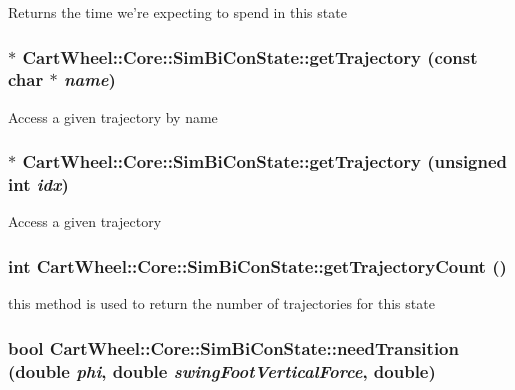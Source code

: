 \label{classCartWheel_1_1Core_1_1SimBiConState_a1af7171d7a15d9dbf166f69b927eee6d}
Returns the time we're expecting to spend in this state \hypertarget{classCartWheel_1_1Core_1_1SimBiConState_ab3928777c060a556240b59b3d78d909f}{
\subsubsection[{getTrajectory}]{$\ast$ CartWheel::Core::SimBiConState::getTrajectory (const char $\ast$ {\em name})}}
\label{classCartWheel_1_1Core_1_1SimBiConState_ab3928777c060a556240b59b3d78d909f}
Access a given trajectory by name \hypertarget{classCartWheel_1_1Core_1_1SimBiConState_a769bdbaf978d76ade4eb32328f1dcaae}{
\subsubsection[{getTrajectory}]{$\ast$ CartWheel::Core::SimBiConState::getTrajectory (unsigned int {\em idx})}}
\label{classCartWheel_1_1Core_1_1SimBiConState_a769bdbaf978d76ade4eb32328f1dcaae}
Access a given trajectory \hypertarget{classCartWheel_1_1Core_1_1SimBiConState_a74bb53554ca7b7ac9a37dd1ce8d2b488}{
\subsubsection[{getTrajectoryCount}]{\setlength{\rightskip}{0pt plus 5cm}int CartWheel::Core::SimBiConState::getTrajectoryCount ()}}
\label{classCartWheel_1_1Core_1_1SimBiConState_a74bb53554ca7b7ac9a37dd1ce8d2b488}
this method is used to return the number of trajectories for this state \hypertarget{classCartWheel_1_1Core_1_1SimBiConState_ab81a60307b3864c9db6953a09b8e53c1}{
\subsubsection[{needTransition}]{\setlength{\rightskip}{0pt plus 5cm}bool CartWheel::Core::SimBiConState::needTransition (double {\em phi}, \/  double {\em swingFootVerticalForce}, \/  double)}}

